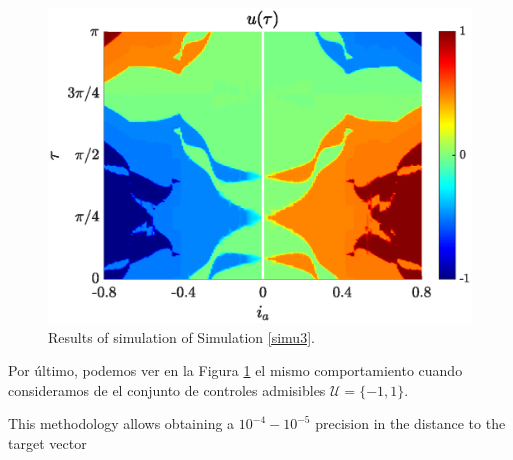 \begin{figure}[ht!]
    \hspace{0.05em}
    \includegraphics[scale=0.525]{img/fig08.eps}
    \caption{Results of simulation of Simulation \ref{simu3}.}
    \label{fig:sim-multi-level}
\end{figure} 

Por último, podemos ver en la Figura \ref{fig:sim-multi-level} el mismo comportamiento cuando consideramos de el conjunto de controles admisibles $\mathcal{U} = \{-1,1\}$.
 

This methodology allows obtaining a $10^{-4}-10^{-5}$ precision in the distance to the target vector
